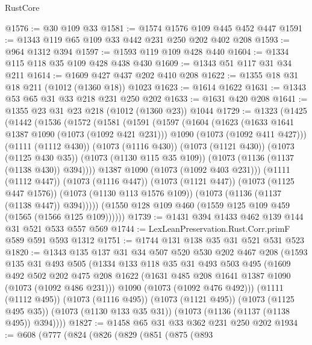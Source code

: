 \begin{lexlean}{RustCore}
\begin{coremodule}
@1576 := @30 @109 @33
@1581 := @1574 @1576 @109 @445 @452 @447
@1591 := @1343 @119 @65 @109 @33 @442 @231 @250 @202 @402 @208
@1593 := @964 @1312 @394
@1597 := @1593 @119 @109 @428 @440
@1604 := @1334 @115 @118 @35 @109 @428 @438 @430
@1609 := @1343 @51 @117 @31 @34 @211
@1614 := @1609 @427 @437 @202 @410 @208
@1622 := @1355 @18 @31 @18 @211 (@1012 (@1360 @18)) @1023
@1623 := @1614 @1622
@1631 := @1343 @53 @65 @31 @33 @218 @231 @250 @202
@1633 := @1631 @420 @208
@1641 := @1355 @23 @31 @23 @218 (@1012 (@1360 @23)) @1044
@1729 := @1323
    (@1425
      (@1442
        (@1536
          (@1572
            (@1581
              (@1591
                (@1597
                  (@1604
                    (@1623
                      (@1633 @1641 @1387 @1090 (@1073 (@1092 @421 @231)))
                      @1090
                      (@1073 (@1092 @411 @427)))
                    (@1111 (@1112 @430))
                    (@1073 (@1116 @430))
                    (@1073 (@1121 @430))
                    (@1073 (@1125 @430 @35))
                    (@1073 (@1130 @115 @35 @109))
                    (@1073 (@1136 (@1137 (@1138 @430)) @394))))
                @1387
                @1090
                (@1073 (@1092 @403 @231)))
              (@1111 (@1112 @447))
              (@1073 (@1116 @447))
              (@1073 (@1121 @447))
              (@1073 (@1125 @447 @1576))
              (@1073 (@1130 @113 @1576 @109))
              (@1073 (@1136 (@1137 (@1138 @447)) @394)))))
        (@1550 @128 @109 @460 (@1559 @125 @109 @459 (@1565 (@1566 @125 @109))))))
@1739 := @1431 @394 @1433 @462 @139 @144 @31 @521 @533 @557 @569
@1744 := LexLeanPreservation.Rust.Corr.primF @589 @591 @593 @1312
@1751 := @1744 @131 @138 @35 @31 @521 @531 @523
@1820 := @1343
    @135
    @137
    @31
    @34
    @507
    @520
    @530
    @202
    @467
    @208
    (@1593
      @135
      @31
      @493
      @505
      (@1334
        @133
        @118
        @35
        @31
        @493
        @503
        @495
        (@1609
          @492
          @502
          @202
          @475
          @208
          @1622
          (@1631 @485 @208 @1641 @1387 @1090 (@1073 (@1092 @486 @231)))
          @1090
          (@1073 (@1092 @476 @492)))
        (@1111 (@1112 @495))
        (@1073 (@1116 @495))
        (@1073 (@1121 @495))
        (@1073 (@1125 @495 @35))
        (@1073 (@1130 @133 @35 @31))
        (@1073 (@1136 (@1137 (@1138 @495)) @394))))
@1827 := @1458 @65 @31 @33 @362 @231 @250 @202
@1934 := @608
    (@777
      (@824
        (@826
          (@829
            (@851
              (@875
                (@893

\end{coremodule}
\end{lexlean}
